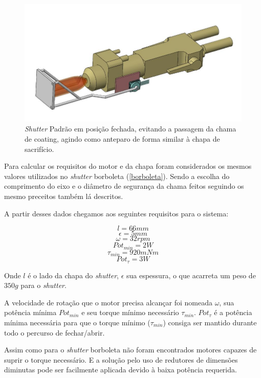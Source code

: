 \begin{figure}[h!]
\centering
	\includegraphics[width=\columnwidth]{figs/estudo/shutter/Padrao_fechado}
	\caption{\textit{Shutter} Padrão em posição fechada, evitando a passagem da
	chama de coating, agindo como anteparo de forma similar à chapa de sacrifício.}
	\label{fig::padrao_fechado}
\end{figure}

Para calcular os requisitos do motor e da chapa foram considerados os mesmos
valores utilizados no \textit{shutter} borboleta (\ref{borboleta}). Sendo a
escolha do comprimento do eixo e o diâmetro de segurança da chama feitos
seguindo os mesmo preceitos também lá descritos.

A partir desses dados chegamos aos seguintes requisitos para o sistema:

\[ l = 66 mm\]
\[ \epsilon = 5 mm\]
\[ \omega = 32 rpm\]
\[ {Pot}_{min} = 2 W \]
\[ \tau_{min} = 920 mNm \]
\[ Pot_{\tau} = 3 W \]


Onde $l$ é o lado da chapa do \textit{shutter}, $\epsilon$ sua espessura, o que
acarreta um peso de $350 g$ para o \textit{shutter}.

A velocidade de rotação que o motor precisa alcançar foi nomeada $\omega$, sua
potência mínima $Pot_{min}$  e seu torque mínimo necessário $\tau_{min}$.
$Pot_{\tau}$ é a potência mínima necessária para que o torque mínimo
($\tau_{min}$) consiga ser mantido durante todo o percurso de fechar/abrir.

Assim como para o \textit{shutter} borboleta não foram encontrados motores
capazes de suprir o torque necessário. E a solução pelo uso de redutores de
dimensões diminutas pode ser facilmente aplicada devido à baixa potência
requerida.

